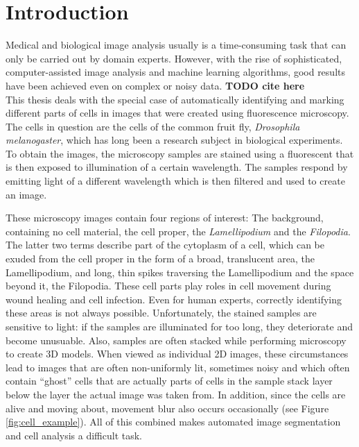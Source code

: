 \chapter{Introduction}
Medical and biological image analysis usually is a time-consuming task that can only be carried out by domain experts. However, with the rise of sophisticated, computer-assisted image analysis and machine learning algorithms, good results have been achieved even on complex or noisy data. \textbf {TODO cite here}\\

\noindent This thesis deals with the special case of automatically identifying and marking different parts of cells in images that were created using fluorescence microscopy. The cells in question are the cells of the common fruit fly, \textit{Drosophila melanogaster}, which has long been a research subject in biological experiments. To obtain the images, the microscopy samples are stained using a fluorescent that is then exposed to illumination of a certain wavelength. The samples respond by emitting light of a different wavelength which is then filtered and used to create an image.

These microscopy images contain four regions of interest: The background, containing no cell material, the cell proper, the \textit{Lamellipodium} and the \textit{Filopodia}. The latter two terms describe part of the cytoplasm of a cell, which can be exuded from the cell proper in the form of a broad, translucent area, the Lamellipodium, and long, thin spikes traversing the Lamellipodium and the space beyond it, the Filopodia. These cell parts play roles in cell movement during wound healing and cell infection. Even for human experts, correctly identifying these areas is not always possible. Unfortunately, the stained samples are sensitive to light: if the samples are illuminated for too long, they deteriorate and become unusuable. Also, samples are often stacked while performing microscopy to create 3D models. When viewed as individual 2D images, these circumstances lead to images that are often non-uniformly lit, sometimes noisy and which often contain ``ghost'' cells that are actually parts of cells in the sample stack layer below the layer the actual image was taken from. In addition, since the cells are alive and moving about, movement blur also occurs occasionally (see Figure \ref{fig:cell_example}). All of this combined makes automated image segmentation and cell analysis a difficult task.\\

